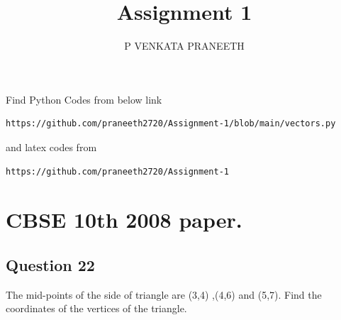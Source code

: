 \documentclass[journal,12pt,twocolumn]{IEEEtran}
\begin{document}
\def\putbox#1#2#3{\makebox[0in][l]{\makebox[#1][l]{}\raisebox{\baselineskip}[0in][0in]{\raisebox{#2}[0in][0in]{#3}}}}
     \def\rightbox#1{\makebox[0in][r]{#1}}
     \def\centbox#1{\makebox[0in]{#1}}
     \def\topbox#1{\raisebox{-\baselineskip}[0in][0in]{#1}}
     \def\midbox#1{\raisebox{-0.5\baselineskip}[0in][0in]{#1}}
\vspace{3cm}
\title{Assignment 1}
\author{P VENKATA PRANEETH}
\maketitle
\newpage
\bigskip
\renewcommand{\thefigure}{\theenumi}
\renewcommand{\thetable}{\theenumi}
Find Python Codes from below link 
%
\begin{lstlisting}
https://github.com/praneeth2720/Assignment-1/blob/main/vectors.py
\end{lstlisting}
%
and latex codes from 
%
\begin{lstlisting}
https://github.com/praneeth2720/Assignment-1
\end{lstlisting}
%
\section{CBSE 10th 2008 paper.}
\subsection{Question 22}
\item 
{}
 The mid-points of the side of triangle are (3,4) ,(4,6) and (5,7). Find the coordinates of the vertices of the triangle.
\end{document}
